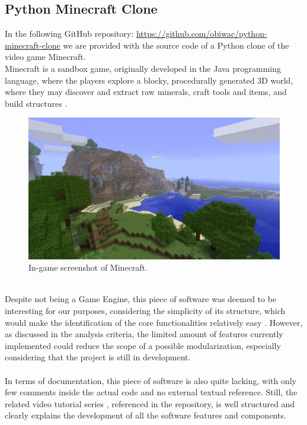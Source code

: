 \subsection{Python Minecraft Clone}
In the following GitHub repository: \href{https://github.com/obiwac/python-minecraft-clone}{https://github.com/obiwac/python-minecraft-clone} we are provided with the source code of a Python clone of the video game Minecraft. \\
Minecraft is a sandbox game, originally developed in the Java programming language, where the players explore a blocky, procedurally generated 3D world, where they may discover and extract raw minerals, craft tools and items, and build structures \cite{site:minecraft-wiki}. 
\begin{figure}[h!]
	\centering
	\includegraphics[width=0.8\linewidth]{"immagini/Feasibility study/Minecraft"}
	\caption[In-game screenshot of Minecraft.]{In-game screenshot of Minecraft.}
	\label{fig:minecraft}
\end{figure}
\\
Despite not being a Game Engine, this piece of software was deemed to be interesting for our purposes, considering the simplicity of its structure, which would make the identification of the core functionalities relatively easy \cite{site:python-minecraft-github}. However, as discussed in the analysis criteria, the limited amount of features currently implemented could reduce the scope of a possible modularization, especially considering that the project is still in development. \\ \\
In terms of documentation, this piece of software is also quite lacking, with only few comments inside the actual code and no external textual reference. Still, the related video tutorial series \cite{site:python-minecraft-tutorial}, referenced in the repository, is well structured and clearly explains the development of all the software features and components.


